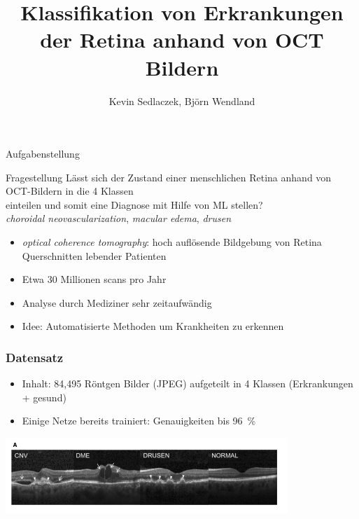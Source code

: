 \documentclass[aspectratio=1610, professionalfonts, 9pt]{beamer}
\title{Klassifikation von Erkrankungen der Retina anhand von OCT Bildern}
\author[K.~Sedlaczek]{Kevin Sedlaczek, Björn Wendland}
\institute[Experimental Physics 4/5]{TU Dortmund \\  Physik}
\begin{document}
\maketitle

\begin{frame}{Aufgabenstellung}
  \begin{block}{Fragestellung}
    \centering
    Lässt sich der Zustand einer menschlichen Retina anhand von OCT-Bildern in die 4 Klassen
    \begin{equation*}
        [\text{NORMAL}, \text{CNV}, \text{DRUSEN}, \text{DME}]
    \end{equation*}
    einteilen und somit eine Diagnose mit Hilfe von ML stellen? \\
    \textit{choroidal neovascularization}, \textit{macular edema}, \textit{drusen}
  \end{block}
  \begin{itemize}
    \item \textit{optical coherence tomography}: hoch auflösende Bildgebung von Retina Querschnitten lebender Patienten
    \item Etwa 30 Millionen scans pro Jahr
    \item Analyse durch Mediziner sehr zeitaufwändig
    \item Idee: Automatisierte Methoden um Krankheiten zu erkennen
  \end{itemize}
\end{frame}

\begin{frame}
    \frametitle{Datensatz}
    \begin{itemize}
      \item Inhalt: 84,495 Röntgen Bilder (JPEG) aufgeteilt in 4 Klassen (Erkrankungen + gesund)
      \item Einige Netze bereits trainiert: Genauigkeiten bis \SI{96}{\percent}
    \end{itemize}
    \centering
    \includegraphics[width=0.8\textwidth]{images/title.png}
\end{frame}

\end{document}
